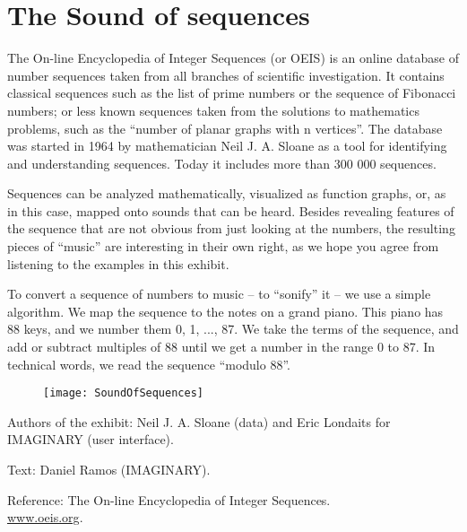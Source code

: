 \section{The Sound of sequences}
The On-line Encyclopedia of Integer Sequences (or OEIS) is an online database of number sequences taken from all branches of scientific investigation. It contains classical sequences such as the list of prime numbers or the sequence of Fibonacci numbers; or less known sequences taken from the solutions to mathematics problems, such as the ``number of planar graphs with n vertices''. The database was started in 1964 by mathematician Neil J. A. Sloane as a tool for identifying and understanding sequences. Today it includes more than 300 000 sequences.

Sequences can be analyzed mathematically, visualized as function graphs, or, as in this case, mapped onto sounds that can be heard. Besides revealing features of the sequence that are not obvious from just looking at the numbers, the resulting pieces of ``music'' are interesting in their own right, as we hope you agree from listening to the examples in this exhibit.

To convert a sequence of numbers to music -- to ``sonify'' it -- we use a simple algorithm. We map the sequence to the notes on a grand piano. This piano has 88 keys, and we number them 0, 1, ..., 87. We take the terms of the sequence, and add or subtract multiples of 88 until we get a number in the range 0 to 87.  In technical words, we read the sequence ``modulo 88''.

\begin{figure}[h]
\centering
\texttt{[image: SoundOfSequences]}
\end{figure}

\begin{sectcredits}
\item[Authors of the exhibit:] Neil J. A. Sloane (data) and Eric Londaits for IMAGINARY (user interface).
\item[Text:] Daniel Ramos (IMAGINARY).
\item[Reference:] The On-line Encyclopedia of Integer Sequences.\\ \url{www.oeis.org}.
\end{sectcredits}

